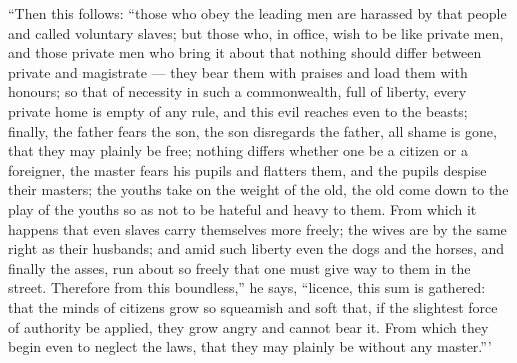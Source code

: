  ``Then this follows: ``those who obey the leading men are harassed by that people and called voluntary slaves; but those who, in office, wish to be like private men, and those private men who bring it about that nothing should differ between private and magistrate --- they bear them with praises and load them with honours; so that of necessity in such a commonwealth, full of liberty, every private home is empty of any rule, and this evil reaches even to the beasts; finally, the father fears the son, the son disregards the father, all shame is gone, that they may plainly be free; nothing differs whether one be a citizen or a foreigner, the master fears his pupils and flatters them, and the pupils despise their masters; the youths take on the weight of the old, the old come down to the play of the youths so as not to be hateful and heavy to them. From which it happens that even slaves carry themselves more freely; the wives are by the same right as their husbands; and amid such liberty even the dogs and the horses, and finally the asses, run about so freely that one must give way to them in the street. Therefore from this boundless,'' he says, ``licence, this sum is gathered: that the minds of citizens grow so squeamish and soft that, if the slightest force of authority be applied, they grow angry and cannot bear it. From which they begin even to neglect the laws, that they may plainly be without any master.'''

